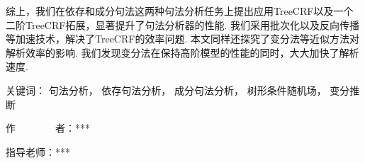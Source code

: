 \begin{cabstract}
\begin{enumerate}
	\end{enumerate}

	综上，我们在依存和成分句法这两种句法分析任务上提出应用TreeCRF以及一个二阶TreeCRF拓展，显著提升了句法分析器的性能.
	我们采用批次化以及反向传播等加速技术，解决了TreeCRF的效率问题.
	本文同样还探究了变分法等近似方法对解析效率的影响.
	我们发现变分法在保持高阶模型的性能的同时，大大加快了解析速度.

	\vskip 21bp
		{\heiti{} 关键词：}
	句法分析，
	依存句法分析，
	成分句法分析，
	树形条件随机场，
	变分推断

	\begin{flushright}
		作~~~~~~~~者：***

		指导老师：***

	\end{flushright}
\end{cabstract}


